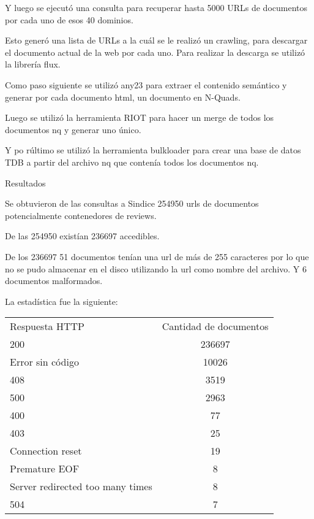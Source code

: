 Y luego se ejecutó una consulta para recuperar hasta 5000 URLs de documentos por cada uno de esos 40 dominios.

Esto generó una lista de URLs a la cuál se le realizó un crawling, para descargar el documento actual de la web por cada uno. Para realizar la descarga se utilizó la librería flux.

Como paso siguiente se utilizó any23 para extraer el contenido semántico  y generar por cada documento html, un documento en N-Quads.

Luego se utilizó la herramienta RIOT para hacer un merge de todos los documentos nq y generar uno único.

Y po rúltimo se utilizó la herramienta bulkloader para crear una base de datos TDB a partir del archivo nq que contenía todos los documentos nq.


Resultados

Se obtuvieron de las consultas a Sindice 254950 urls de documentos potencialmente contenedores de reviews.

De las 254950 existían 236697 accedibles.

De los 236697 51 documentos tenían una url de más de 255 caracteres por lo que no se pudo almacenar en el disco utilizando la url como nombre del archivo. Y 6 documentos malformados.

La estadística fue la siguiente:

\begin{tabular}{| l | c | }
   Respuesta HTTP & Cantidad de documentos \\
   200 & 236697 \\
   Error sin código & 10026 \\
   408 & 3519 \\
   500 & 2963 \\
   400 & 77 \\
   403 & 25 \\
   Connection reset & 19 \\
   Premature EOF & 8 \\
   Server redirected too many times & 8 \\
   504 & 7 \\
 \end{tabular}

